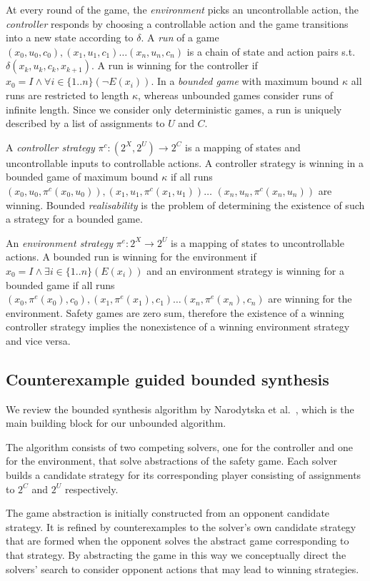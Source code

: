 \documentclass{llncs}
\begin{document}
At every round of the game, the \emph{environment} picks an uncontrollable
action, the \emph{controller} responds by choosing a controllable action and
the game transitions into a new state according to $\delta$.  A \emph{run} of a
game $(x_0, u_0, c_0), (x_1, u_1, c_1) \dots (x_n, u_n, c_n)$ is a chain of
state and action pairs s.t.\,$\delta(x_k, u_k, c_k, x_{k+1})$.  A run is
winning for the controller if $x_0 = I \land \forall i \in \{1..n\} (\lnot
E(x_i))$.  In a \emph{bounded game} with maximum bound $\kappa$ all runs are
restricted to length $\kappa$, whereas unbounded games consider runs of
infinite length.  Since we consider only deterministic games, a run is uniquely
described by a list of assignments to $U$ and $C$.

A \emph{controller strategy} $\pi^c : (2^X, 2^U) \to 2^C$ is a mapping of states and
uncontrollable inputs to controllable actions. A controller strategy is winning
in a bounded game of maximum bound $\kappa$ if all runs $(x_0, u_0, \pi^c(x_0,
u_0)), (x_1, u_1, \pi^c(x_1, u_1)) \dots$ $(x_n, u_n, \pi^c(x_n, u_n))$ are
winning.  Bounded \emph{realisability} is the problem of determining the
existence of such a strategy for a bounded game.

An \emph{environment strategy} $\pi^e : 2^X \to 2^U$ is a mapping of states to
uncontrollable actions. A bounded run is winning for the environment if $x_0 =
I \land \exists i \in \{1..n\} (E(x_i))$ and an environment strategy is winning
for a bounded game if all runs $(x_0, \pi^e(x_0), c_0), (x_1, \pi^e(x_1), c_1)
\dots (x_n, \pi^e(x_n), c_n)$ are winning for the environment.  Safety games
are zero sum, therefore the existence of a winning controller strategy implies
the nonexistence of a winning environment strategy and vice versa.

\subsection{Counterexample guided bounded synthesis}

We review the bounded synthesis algorithm by Narodytska et
al.~\cite{narodytska2014}, which is the main building block for our unbounded
algorithm.

The algorithm consists of two competing solvers, one for the controller and one for
the environment, that solve abstractions of the safety game. Each solver builds
a candidate strategy for its corresponding player consisting of assignments to
$2^C$ and $2^U$ respectively. 

The game abstraction is initially constructed from an opponent candidate
strategy. It is refined by counterexamples to the solver's own candidate
strategy that are formed when the opponent solves the abstract game
corresponding to that strategy. By abstracting the game in this way we
conceptually direct the solvers' search to consider opponent actions that may
lead to winning strategies.
\end{document}
